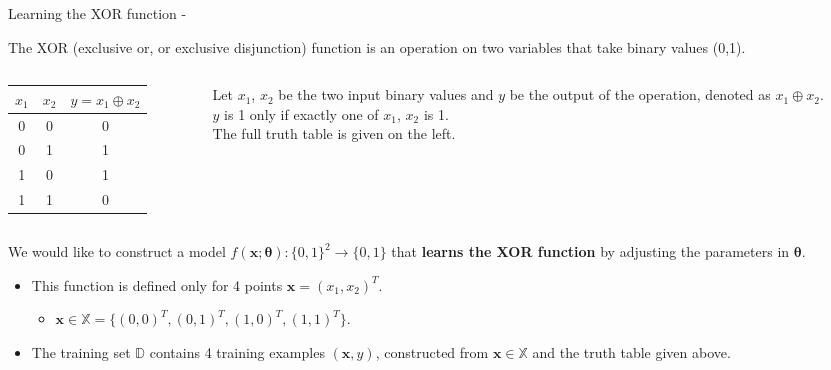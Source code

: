 %
%

\begin{frame}[t,allowframebreaks]{Learning the XOR function -} 

    The XOR (exclusive or, or exclusive disjunction) function
    is an operation on two variables that take binary values (0,1).\\
    \vspace{0.2cm}

    \begin{columns}[t]
        \begin{column}{0.32\textwidth}
            \vspace{-1.1cm}
            \begin{center}
                \begin{tabular}{ c c | c }
                 $x_1$ & $x_2$ & $y = x_1 \oplus x_2$ \\ 
                 \hline
                 0 & 0 & 0 \\  
                 0 & 1 & 1 \\   
                 1 & 0 & 1 \\  
                 1 & 1 & 0 \\   
                \end{tabular}
            \end{center}
        \end{column}
        \begin{column}{0.68\textwidth}
            Let $x_1$, $x_2$ be the two input binary values
            and $y$ be the output of the operation, denoted as $x_1 \oplus x_2$.\\
            \vspace{0.2cm}
            $y$ is 1 only if exactly one of $x_1$, $x_2$ is 1.\\ 
            \vspace{0.2cm}
            The full truth table is given on the left.\\
        \end{column}
    \end{columns}

    \vspace{0.3cm}

    We would like to construct a model 
    $f(\mathbf{x};\mathbf{\theta}):\{0,1\}^2\rightarrow\{0,1\}$ 
    that {\bf learns the XOR function} 
    by adjusting the parameters in $\mathbf{\theta}$.
    \begin{itemize}
        \item 
        This function is defined only for 
        4 points $\mathbf{x}=(x_1,x_2)^T$.
        \begin{itemize}
         \item 
         $\mathbf{x} \in \mathbb{X} 
          = \{(0,0)^T, (0,1)^T, (1,0)^T, (1,1)^T\}$.
        \end{itemize}
        \item 
        The training set $\mathbb{D}$ contains 
        4 training examples $(\mathbf{x},y)$,
        constructed from $\mathbf{x} \in \mathbb{X}$ 
        and the truth table given above.
    \end{itemize}


\end{frame}
